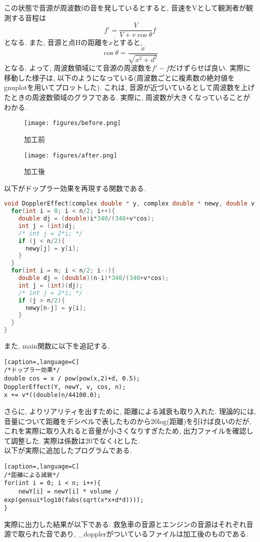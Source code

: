\documentclass{ltjsarticle}
\begin{document}
この状態で音源が周波数fの音を発しているとすると, 音速をVとして観測者が観測する音程は
\[
f' = \frac{V}{V+v\cos\theta}f
\]
となる. また, 音源と点Hの距離を$x$とすると, 
\[
\cos\theta = \frac{x}{\sqrt{x^2+d^2}}
\]
となる. よって, 周波数領域にて音源の周波数を$f'-f$だけずらせば良い. 
実際に移動した様子は, 以下のようになっている(周波数ごとに複素数の絶対値をgnuplotを用いてプロットした). これは, 音源が近づいているとして周波数を上げたときの周波数領域のグラフである. 実際に, 周波数が大きくなっていることがわかる. 
\begin{figure}[H]
    \begin{center}
        \texttt{[image: figures/before.png]}
        \caption{加工前}
    \end{center}
\end{figure}
\begin{figure}[H]
    \begin{center}
        \texttt{[image: figures/after.png]}
        \caption{加工後}
    \end{center}
\end{figure}
以下がドップラー効果を再現する関数である. 
\begin{lstlisting}[caption=DopplerEffect,language=C]
void DopplerEffect(complex double * y, complex double * newy, double v, double cos, long n) {
  for(int i = 0; i < n/2; i++){
    double dj = (double)i*340/(340+v*cos);
    int j = (int)dj;
    /* int j = 2*i; */
    if (j < n/2){
      newy[j] = y[i];
    }
  }
  for(int i = n; i < n/2; i--){
    double dj = (double)(n-i)*340/(340+v*cos);
    int j = (int)(dj);
    /* int j = 2*i; */
    if (j > n/2){
      newy[n-j] = y[i];
    }
  }
}
\end{lstlisting}
また, main関数に以下を追記する. 
\begin{lstlisting}[caption=,language=C]
/*ドップラー効果*/
double cos = x / pow(pow(x,2)+d, 0.5);
DopplerEffect(Y, newY, v, cos, n);
x += v*((double)n/44100.0);
\end{lstlisting}

さらに, よりリアリティを出すために, 距離による減衰も取り入れた. 理論的には, 音量について距離をデシベルで表したものから20log(距離)を引けば良いのだが, これを実際に取り入れると音量が小さくなりすぎたため, 出力ファイルを確認して調整した. 実際は係数は20でなく4とした. \\
以下が実際に追加したプログラムである. 
\begin{lstlisting}[caption=,language=C]
/*距離による減衰*/
for(int i = 0; i < n; i++){
    newY[i] = newY[i] * volume / exp(gensui*log10(fabs(sqrt(x*x+d*d))));
}
\end{lstlisting}
実際に出力した結果が以下である. 救急車の音源とエンジンの音源はそれぞれ音源で取られた音であり, \_dopplerがついているファイルは加工後のものである. 
\end{document}
